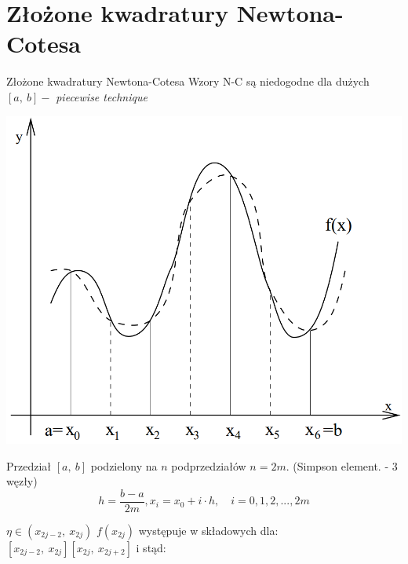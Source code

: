 \section{Złożone kwadratury Newtona-Cotesa}
	\begin{frame}{Złożone kwadratury Newtona-Cotesa}
		Wzory N-C są niedogodne dla dużych $[a,\ b]-$ {\it piecewise technique}
        \begin{center}
      		\includegraphics[width=0.6\linewidth]{img/6/image004.png}
      	\end{center}
	\end{frame}
	\begin{frame}
		Przedział $[a,\ b]$ podzielony na $n$ podprzedziałów $n=2m.$
        \newline
        (Simpson element. - 3 węzły)  
        $$
        h=\frac{b-a}{2m}, x_{i}=x_{0}+i\cdot h,\quad i=0, 1, 2, . . . , 2m
        $$

        $\eta\in(x_{2j-2},\ x_{2j})$
        \newline
        \newline
        $f(x_{2j})$ występuje w składowych dla: $[x_{2j-2},\ x_{2j}]  [x_{2j},\ x_{2j+2}]$ i stąd:
        \newline

	\end{frame}
